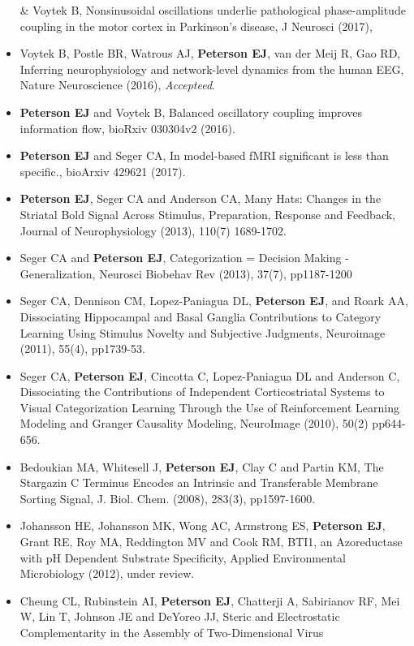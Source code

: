 \begin{itemize}
  \& Voytek B, Nonsinusoidal oscillations underlie pathological
  phase-amplitude coupling in the motor cortex in Parkinson's disease, J
  Neurosci (2017),
\item
  Voytek B, Postle BR, Watrous AJ, \textbf{Peterson EJ}, van der Meij R,
  Gao RD, Inferring neurophysiology and network-level dynamics from the
  human EEG, Nature Neuroscience (2016), \emph{Accepteed}.
\item
  \textbf{Peterson EJ} and Voytek B, Balanced oscillatory coupling
  improves information flow, bioRxiv 030304v2 (2016).
\item
  \textbf{Peterson EJ} and Seger CA, In model-based fMRI significant is
  less than specific., bioArxiv 429621 (2017).
\item
  \textbf{Peterson EJ}, Seger CA and Anderson CA, Many Hats: Changes in
  the Striatal Bold Signal Across Stimulus, Preparation, Response and
  Feedback, Journal of Neurophysiology (2013), 110(7) 1689-1702.
\item
  Seger CA and \textbf{Peterson EJ}, Categorization = Decision Making -
  Generalization, Neurosci Biobehav Rev (2013), 37(7), pp1187-1200
\item
  Seger CA, Dennison CM, Lopez-Paniagua DL, \textbf{Peterson EJ}, and
  Roark AA, Dissociating Hippocampal and Basal Ganglia Contributions to
  Category Learning Using Stimulus Novelty and Subjective Judgments,
  Neuroimage (2011), 55(4), pp1739-53.
\item
  Seger CA, \textbf{Peterson EJ}, Cincotta C, Lopez-Paniagua DL and
  Anderson C, Dissociating the Contributions of Independent
  Corticostriatal Systems to Visual Categorization Learning Through the
  Use of Reinforcement Learning Modeling and Granger Causality Modeling,
  NeuroImage (2010), 50(2) pp644-656.
\item
  Bedoukian MA, Whitesell J, \textbf{Peterson EJ}, Clay C and Partin KM,
  The Stargazin C Terminus Encodes an Intrinsic and Transferable
  Membrane Sorting Signal, J. Biol. Chem. (2008), 283(3), pp1597-1600.
\item
  Johansson HE, Johansson MK, Wong AC, Armstrong ES, \textbf{Peterson
  EJ}, Grant RE, Roy MA, Reddington MV and Cook RM, BTI1, an
  Azoreductase with pH Dependent Substrate Specificity, Applied
  Environmental Microbiology (2012), under review.
\item
  Cheung CL, Rubinstein AI, \textbf{Peterson EJ}, Chatterji A,
  Sabirianov RF, Mei W, Lin T, Johnson JE and DeYoreo JJ, Steric and
  Electrostatic Complementarity in the Assembly of Two-Dimensional Virus

\end{itemize}
